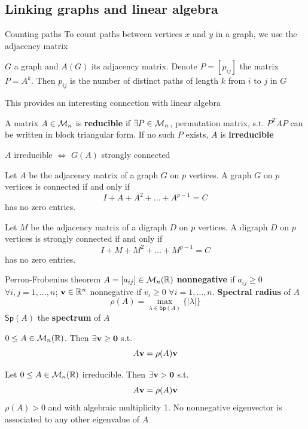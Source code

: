 \documentclass[aspectratio=169]{beamer}
\begin{document}
\subsection{Linking graphs and linear algebra}

\begin{frame}{Counting paths}
	To count paths between vertices $x$ and $y$ in a graph, we use the adjacency matrix
	\vfill
	\begin{theorem}
		$G$ a graph and $A(G)$ its adjacency matrix. Denote $P=[p_{ij}]$ the matrix $P=A^k$. Then $p_{ij}$ is the number of distinct paths of length $k$ from $i$ to $j$ in $G$
	\end{theorem}
	\vfill
	This provides an interesting connection with linear algebra
	\begin{definition}
		A matrix $A\in\mathcal{M}_n$ is \textbf{reducible} if $\exists P\in\mathcal{M}_n$, permutation matrix, s.t. $P^TAP$ can be written in block triangular form. If no such $P$ exists, $A$ is \textbf{irreducible}
	\end{definition}
	\vfill
	\begin{theorem}
		$A$ irreducible $\iff$ $G(A)$ strongly connected
	\end{theorem}
\end{frame}

\begin{frame}
	\begin{theorem}
		Let $A$ be the adjacency matrix of a graph $G$ on $p$ vertices. 
		A graph $G$ on $p$ vertices is connected if and only if $$I+A+A^2+\dots+A^{p-1}=C$$
		has no zero entries.
	\end{theorem}
	\begin{theorem}
		Let $M$ be the adjacency matrix of a digraph $D$ on $p$ vertices. 
		A digraph $D$ on $p$ vertices is strongly connected if and only if $$I+M+M^2+\dots+M^{p-1}=C$$
		has no zero entries.
	\end{theorem}
\end{frame}


\begin{frame}{Perron-Frobenius theorem}
\vfill
$A=[a_{ij}]\in\mathcal{M}_n(\mathbb{R})$ \textbf{nonnegative} if $a_{ij}\geq 0$ $\forall i,j=1,\ldots,n$; $\mathbf{v}\in\mathbb{R}^n$ nonnegative if $v_i\geq 0$ $\forall i=1,\ldots,n$.  \textbf{Spectral radius} of $A$
\[
\rho(A) = \max_{\lambda\in\mathsf{Sp}(A)}\{|\lambda|\}
\]
$\mathsf{Sp}(A)$ the \textbf{spectrum} of $A$
\vfill
\begin{theorem}
$0\leq A\in\mathcal{M}_n(\mathbb{R})$. Then $\exists\bv\geq\b0$ s.t. 
\[
	A\mathbf{v}=\rho(A)\mathbf{v}
\]
\end{theorem}
\vfill

\begin{theorem}
	\label{th:PF}
	Let $0\leq A\in \mathcal{M}_n(\mathbb{R})$ irreducible. Then $\exists\bv>\b0$ s.t.
	\[
		A\mathbf{v}=\rho(A)\mathbf{v}
	\]
	$\rho(A)>0$ and with algebraic multiplicity 1.
	No nonnegative eigenvector is associated to any other eigenvalue of $A$
\end{theorem}
\end{frame}
\end{document}
